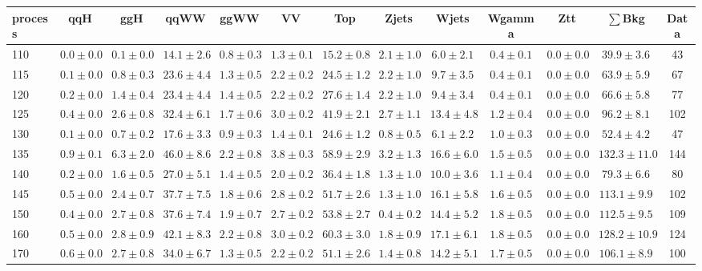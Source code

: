 \begin{table}
{%
 \tiny
 \begin{center}
 \begin{tabular}{l | c c | c c c c c c c c  | c c}
 \hline
 process & qqH & ggH & qqWW & ggWW & VV & Top & Zjets & Wjets & Wgamma & Ztt & $\sum$Bkg & Data \\
 \hline
110 & $0.0\pm0.0$ & $0.1\pm0.0$ & $14.1\pm2.6$ & $0.8\pm0.3$ & $1.3\pm0.1$ & $15.2\pm0.8$ & $2.1\pm1.0$ & $6.0\pm2.1$ & $0.4\pm0.1$ & $0.0\pm0.0$ & $39.9\pm3.6$ & 43 \\
115 & $0.1\pm0.0$ & $0.8\pm0.3$ & $23.6\pm4.4$ & $1.3\pm0.5$ & $2.2\pm0.2$ & $24.5\pm1.2$ & $2.2\pm1.0$ & $9.7\pm3.5$ & $0.4\pm0.1$ & $0.0\pm0.0$ & $63.9\pm5.9$ & 67 \\
120 & $0.2\pm0.0$ & $1.4\pm0.4$ & $23.4\pm4.4$ & $1.4\pm0.5$ & $2.2\pm0.2$ & $27.6\pm1.4$ & $2.2\pm1.0$ & $9.4\pm3.4$ & $0.4\pm0.1$ & $0.0\pm0.0$ & $66.6\pm5.8$ & 77 \\
125 & $0.4\pm0.0$ & $2.6\pm0.8$ & $32.4\pm6.1$ & $1.7\pm0.6$ & $3.0\pm0.2$ & $41.9\pm2.1$ & $2.7\pm1.1$ & $13.4\pm4.8$ & $1.2\pm0.4$ & $0.0\pm0.0$ & $96.2\pm8.1$ & 102 \\
130 & $0.1\pm0.0$ & $0.7\pm0.2$ & $17.6\pm3.3$ & $0.9\pm0.3$ & $1.4\pm0.1$ & $24.6\pm1.2$ & $0.8\pm0.5$ & $6.1\pm2.2$ & $1.0\pm0.3$ & $0.0\pm0.0$ & $52.4\pm4.2$ & 47 \\
135 & $0.9\pm0.1$ & $6.3\pm2.0$ & $46.0\pm8.6$ & $2.2\pm0.8$ & $3.8\pm0.3$ & $58.9\pm2.9$ & $3.2\pm1.3$ & $16.6\pm6.0$ & $1.5\pm0.5$ & $0.0\pm0.0$ & $132.3\pm11.0$ & 144 \\
140 & $0.2\pm0.0$ & $1.6\pm0.5$ & $27.0\pm5.1$ & $1.4\pm0.5$ & $2.0\pm0.2$ & $36.4\pm1.8$ & $1.3\pm1.0$ & $10.0\pm3.6$ & $1.1\pm0.4$ & $0.0\pm0.0$ & $79.3\pm6.6$ & 80 \\
145 & $0.5\pm0.0$ & $2.4\pm0.7$ & $37.7\pm7.5$ & $1.8\pm0.6$ & $2.8\pm0.2$ & $51.7\pm2.6$ & $1.3\pm1.0$ & $16.1\pm5.8$ & $1.6\pm0.5$ & $0.0\pm0.0$ & $113.1\pm9.9$ & 102 \\
150 & $0.4\pm0.0$ & $2.7\pm0.8$ & $37.6\pm7.4$ & $1.9\pm0.7$ & $2.7\pm0.2$ & $53.8\pm2.7$ & $0.4\pm0.2$ & $14.4\pm5.2$ & $1.8\pm0.5$ & $0.0\pm0.0$ & $112.5\pm9.5$ & 109 \\
160 & $0.5\pm0.0$ & $2.8\pm0.9$ & $42.1\pm8.3$ & $2.2\pm0.8$ & $3.0\pm0.2$ & $60.3\pm3.0$ & $1.8\pm0.9$ & $17.1\pm6.1$ & $1.8\pm0.5$ & $0.0\pm0.0$ & $128.2\pm10.9$ & 124 \\
170 & $0.6\pm0.0$ & $2.7\pm0.8$ & $34.0\pm6.7$ & $1.3\pm0.5$ & $2.2\pm0.2$ & $51.1\pm2.6$ & $1.4\pm0.8$ & $14.2\pm5.1$ & $1.7\pm0.5$ & $0.0\pm0.0$ & $106.1\pm8.9$ & 100 \\

\end{tabular}
\end{center}}
\end{table}
